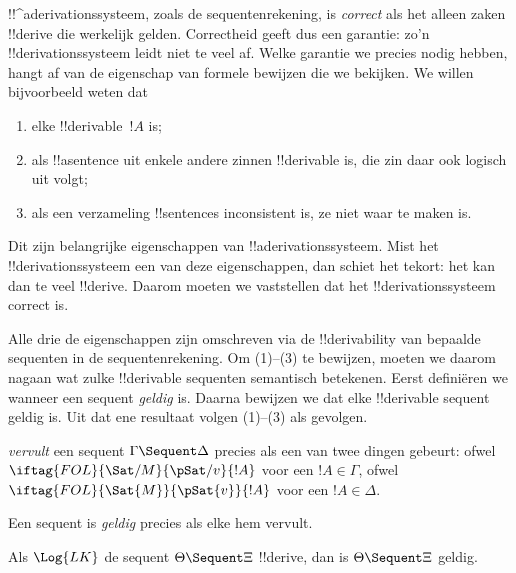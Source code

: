 \documentclass[../../../include/open-logic-section]{subfiles}
\begin{document}
      {}
      {}


\begin{explain}
!!^a{derivation}ssysteem, zoals de sequentenrekening, is \emph{correct}
als het alleen zaken !!{derive} die werkelijk gelden. Correctheid geeft
dus een garantie: zo'n !!{derivation}ssysteem leidt niet te veel
af. Welke garantie we precies nodig hebben, hangt af van de eigenschap
van formele bewijzen die we bekijken. We willen bijvoorbeeld weten dat
\begin{enumerate}
\item elke !!{derivable}~$!A$  is;
\item als !!a{sentence} uit enkele andere zinnen !!{derivable}
  is, die zin daar ook logisch uit volgt;
\item als een verzameling !!{sentence}s inconsistent is, ze
  niet waar te maken is.
\end{enumerate}
Dit zijn belangrijke eigenschappen van !!a{derivation}ssysteem. Mist
het !!{derivation}ssysteem een van deze eigenschappen, dan schiet het
tekort: het kan dan te veel !!{derive}. Daarom moeten we vaststellen
dat het !!{derivation}ssysteem correct is.

Alle drie de eigenschappen zijn omschreven via de !!{derivability} van
bepaalde sequenten in de sequentenrekening. Om (1)--(3) te bewijzen,
moeten we daarom nagaan wat zulke !!{derivable} sequenten semantisch
betekenen. Eerst definiëren we wanneer een sequent \emph{geldig} is.
Daarna bewijzen we dat elke !!{derivable} sequent geldig is. Uit dat
ene resultaat volgen (1)--(3) als gevolgen.
\end{explain}

\begin{defn}
 \emph{vervult} een sequent
$\Gamma \Sequent \Delta$ precies als een van twee dingen gebeurt:
ofwel $\iftag{FOL}{\Sat/{M}}{\pSat/{v}}{!A}$ voor een $!A \in \Gamma$,
ofwel $\iftag{FOL}{\Sat{M}}{\pSat{v}}{!A}$ voor een $!A \in \Delta$.

Een sequent is \emph{geldig} precies als elke
hem vervult.
\end{defn}

\begin{thm}[Correctheid]
 Als $\Log{LK}$ de sequent $\Theta
\Sequent \Xi$ !!{derive}, dan is $\Theta \Sequent \Xi$ geldig.
\end{thm}
\end{document}
